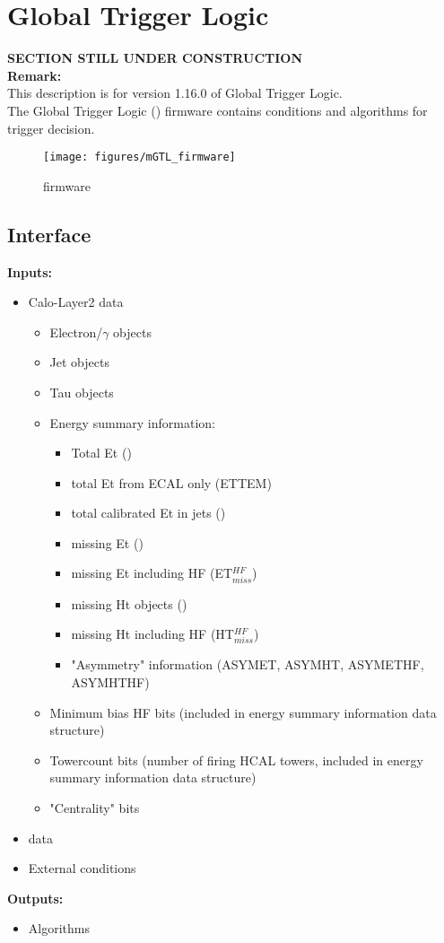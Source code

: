 \section{Global Trigger Logic}
\label{sec:gtl:global_trigger_logic}

\textbf{SECTION STILL UNDER CONSTRUCTION}\\

\textbf{Remark:}\\
This description is for version 1.16.0 of Global Trigger Logic.\\

The Global Trigger Logic (\ugtl) firmware contains conditions and algorithms for trigger decision.

\begin{figure}[htb]
\centering
\texttt{[image: figures/mGTL\_firmware]}
\caption{\ugtl firmware}
\label{fig:gtl:mGTL_firmware}
\end{figure}

\subsection{\ugtl Interface}
\label{sec:gtl:ugtl_interface}

\textbf{Inputs:}
\begin{itemize}
\item Calo-Layer2 data
\begin{itemize}
\item Electron/$\gamma$ objects
\item Jet objects
\item Tau objects
\item Energy summary information:
\begin{itemize}
\item Total Et (\ett)
\item total Et from ECAL only (ETTEM)
\item total calibrated Et in jets (\htt)
\item missing Et (\etm)
\item missing Et including HF (ET$_{miss}^{HF}$)
\item missing Ht objects (\htm)
\item missing Ht including HF (HT$_{miss}^{HF}$)
\item "Asymmetry" information (ASYMET, ASYMHT, ASYMETHF, ASYMHTHF)
\end{itemize}
\item Minimum bias HF bits (included in energy summary information data structure)
\item Towercount bits (number of firing HCAL towers, included in energy summary information data structure)
\item "Centrality" bits
\end{itemize}
\item \gmt data
\item External conditions
\end{itemize}
\textbf{Outputs:}
\begin{itemize}
\item Algorithms
\end{itemize}

